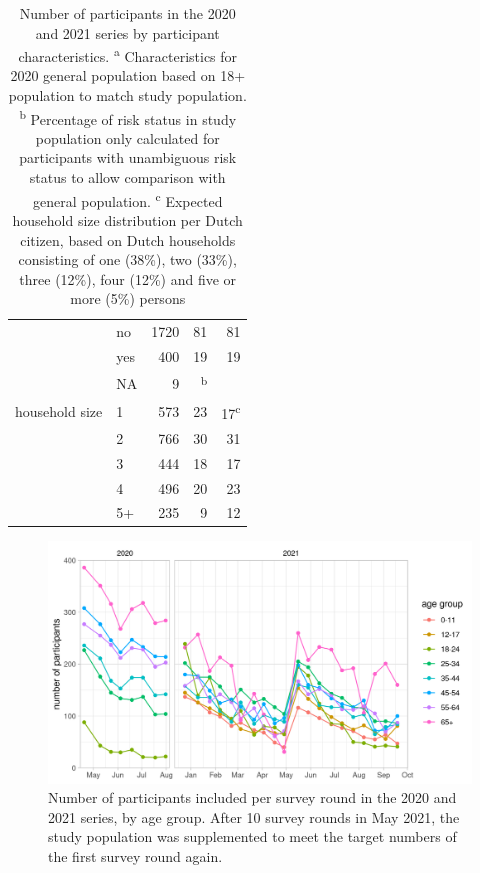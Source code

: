 \documentclass[fleqn,10pt]{wlscirep}
\begin{document}
\begin{table}[ht]
\begin{tabular}{llrrr}
   & no & 1720 & 81 & 81 \\ 
   & yes & 400 & 19 & 19 \\ 
   & NA & 9 & \textsuperscript{b} &  \\ 
  \hline
  household size & 1 & 573 & 23 & 17\textsuperscript{c} \\ 
   & 2 & 766 & 30 & 31 \\ 
   & 3 & 444 & 18 & 17 \\ 
   & 4 & 496 & 20 & 23 \\ 
   & 5+ & 235 & 9 & 12 \\ 
  \hline
  \hline
\end{tabular}
\caption{\label{tab:part}Number of participants in the 2020 and 2021 series by participant characteristics.
 \protect\linebreak \textsuperscript{a} Characteristics for 2020 general population based on 18+ population to match study population.
 \protect\linebreak \textsuperscript{b} Percentage of risk status in study population only calculated for participants with unambiguous risk status to allow comparison with general population.
\protect\linebreak \textsuperscript{c} Expected household size distribution per Dutch citizen, based on Dutch households consisting of one (38\%), two (33\%), three (12\%), four (12\%) and five or more (5\%) persons \cite{Backer_2021}}
\end{table}



\clearpage

\begin{figure}[ht]
\centering
\includegraphics[width=\linewidth]{../figures/number_participants.png}
\caption{Number of participants included per survey round in the 2020 and 2021 series, by age group. After 10 survey rounds in May 2021, the study population was supplemented to meet the target numbers of the first survey round again.}
\label{fig:part}
\end{figure}
\end{document}
